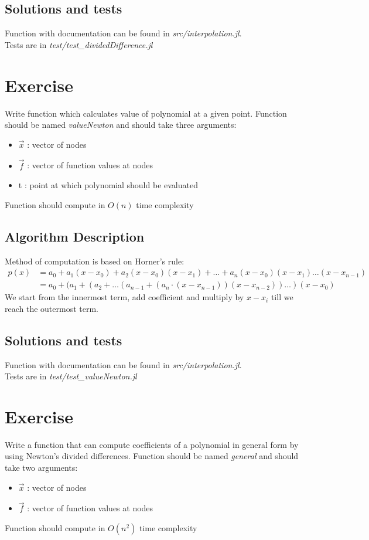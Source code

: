 \documentclass[11pt]{article}
\begin{document}
\subsection*{Solutions and tests}
Function with documentation can be found in \textit{src/interpolation.jl}. \\
Tests are in \textit{test/test\_dividedDifference.jl}

\section{Exercise}
Write function which calculates value of polynomial at a given point.
Function should be named \textit{valueNewton} and should take three arguments: 
\begin{itemize}
    \item $\vec{x}$ : vector of nodes
    \item $\vec{f}$ : vector of function values at nodes
    \item t : point at which polynomial should be evaluated
\end{itemize}
Function should compute in $O(n)$ time complexity
\subsection*{Algorithm Description}
Method of computation is based on Horner's rule:
\begin{equation*}
\begin{split}
    p(x) &= a_0 + a_1(x-x_0) + a_2(x-x_0)(x-x_1) + \dots + a_n(x-x_0)(x-x_1)\dots(x-x_{n-1})\\
     &= a_0 + (a_1 + (a_2 + \dots (a_{n-1} + (a_n \cdot (x-x_{n-1}))(x-x_{n-2}))\dots)(x-x_0)
\end{split}
\end{equation*}
We start from the innermost term, add coefficient and multiply by ${x-x_i}$ till we reach the outermost term.
\subsection*{Solutions and tests}
Function with documentation can be found in \textit{src/interpolation.jl}.\\
Tests are in \textit{test/test\_valueNewton.jl}
\section{Exercise}
Write a function that can compute coefficients of a polynomial in general form by using Newton's divided differences.
Function should be named \textit{general} and should take two arguments:
\begin{itemize}
    \item $\vec{x}$ : vector of nodes
    \item $\vec{f}$ : vector of function values at nodes
\end{itemize}
Function should compute in $O(n^2)$ time complexity
\end{document}
